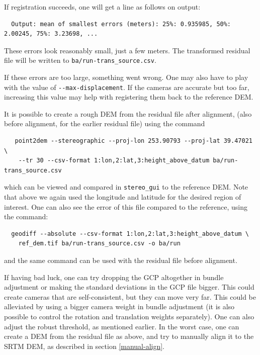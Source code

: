 If registration succeeds, one will get a line as follows on output:
\begin{verbatim}
  Output: mean of smallest errors (meters): 25%: 0.935985, 50%: 2.00245, 75%: 3.23698, ...
\end{verbatim}

These errors look reasonably small, just a few meters. The transformed
residual file will be written to \texttt{ba/run-trans\_source.csv}.

If these errors are too large, something went wrong. One may also have to play
with the value of \texttt{-\/-max-displacement}. If the cameras are accurate
but too far, increasing this value may help with registering them back to the reference DEM.

It is possible to create a rough DEM from the residual file after alignment, 
(also before alignment, for the earlier residual file) using the command

\begin{verbatim}
   point2dem --stereographic --proj-lon 253.90793 --proj-lat 39.47021            \
    --tr 30 --csv-format 1:lon,2:lat,3:height_above_datum ba/run-trans_source.csv
\end{verbatim}

which can be viewed and compared in \texttt{stereo\_gui} to the reference DEM. 
Note that above we again used the longitude and latitude for the desired region 
of interest. One can also see the error of this file compared to the reference, using
the command:

\begin{verbatim}
  geodiff --absolute --csv-format 1:lon,2:lat,3:height_above_datum \
    ref_dem.tif ba/run-trans_source.csv -o ba/run
\end{verbatim}

and the same command can be used with the residual file before alignment.

If having bad luck, one can try dropping the GCP altogether in bundle
adjustment or making the standard deviations in the GCP file
bigger. This could create cameras that are self-consistent, but they can
move very far. This could be alleviated by using a bigger camera weight
in bundle adjustment (it is also possible to control the rotation and
translation weights separately). One can also adjust the robust
threshold, as mentioned earlier.  In the worst case, one can create a
DEM from the residual file as above, and try to manually align it to the
SRTM DEM, as described in section \ref{manual-align}.

